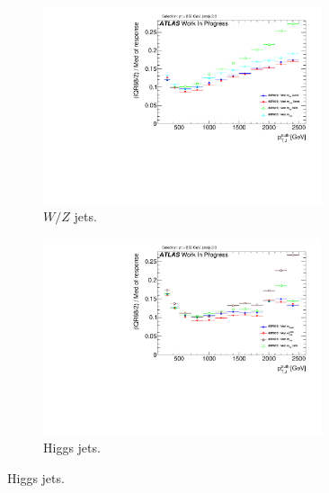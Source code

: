 \begin{figure}
    \centering
    \begin{subfigure}[b]{0.45\textwidth}
  \centering
      \includegraphics[width=0.9\textwidth]{jet_part/mcomb/mcombtas3.pdf}
  \caption[$\mcombtas$ on the boosted $W/Z$]{$W/Z$ jets.}
  \label{fig:mcombtas3}
    \end{subfigure}
    \begin{subfigure}[b]{0.45\textwidth}
  \centering
      \includegraphics[width=0.9\textwidth]{jet_part/mcomb/mcombtas5.pdf}
  \caption[$\mcombtas$ on the boosted Higgs]{Higgs jets.}
  \label{fig:mcombtas5}
    \end{subfigure}


\end{figure}
